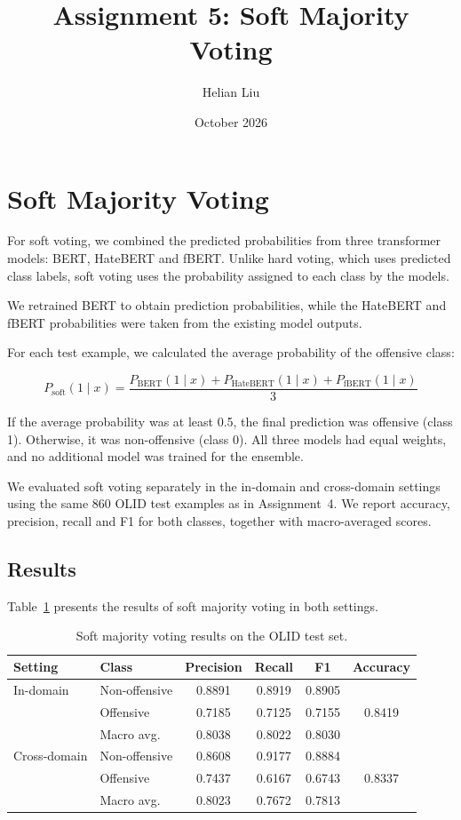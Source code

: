 \documentclass{article}
\title{Assignment 5: Soft Majority Voting}
\author{Helian Liu}
\date{October 2026}
\begin{document}
\maketitle

\section{Soft Majority Voting}

For soft voting, we combined the predicted probabilities from three transformer models: BERT, HateBERT and fBERT. Unlike hard voting, which uses predicted class labels, soft voting uses the probability assigned to each class by the models.

We retrained BERT to obtain prediction probabilities, while the HateBERT and fBERT probabilities were taken from the existing model outputs.

For each test example, we calculated the average probability of the offensive class:

\begin{equation}
P_{\mathrm{soft}}(1 \mid x) =
\frac{
P_{\mathrm{BERT}}(1 \mid x) +
P_{\mathrm{HateBERT}}(1 \mid x) +
P_{\mathrm{fBERT}}(1 \mid x)
}{3}
\end{equation}

If the average probability was at least 0.5, the final prediction was offensive (class 1). Otherwise, it was non-offensive (class 0). All three models had equal weights, and no additional model was trained for the ensemble.

We evaluated soft voting separately in the in-domain and cross-domain settings using the same 860 OLID test examples as in Assignment~4. We report accuracy, precision, recall and F1 for both classes, together with macro-averaged scores.

\subsection{Results}

Table~\ref{tab:soft-voting-results} presents the results of soft majority voting in both settings.

\begin{table}[htbp]
\centering
\caption{Soft majority voting results on the OLID test set.}
\label{tab:soft-voting-results}
\begin{tabular}{llcccc}
\toprule
Setting & Class & Precision & Recall & F1 & Accuracy \\
\midrule
In-domain & Non-offensive & 0.8891 & 0.8919 & 0.8905 & \\
          & Offensive     & 0.7185 & 0.7125 & 0.7155 & 0.8419 \\
          & Macro avg.    & 0.8038 & 0.8022 & 0.8030 & \\
\midrule
Cross-domain & Non-offensive & 0.8608 & 0.9177 & 0.8884 & \\
             & Offensive     & 0.7437 & 0.6167 & 0.6743 & 0.8337 \\
             & Macro avg.    & 0.8023 & 0.7672 & 0.7813 & \\
\bottomrule
\end{tabular}
\end{table}
\end{document}
